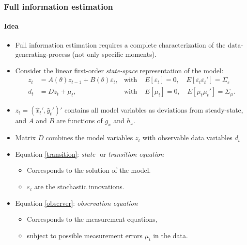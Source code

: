 \documentclass[handout]{beamer}  %
\begin{document}
\begin{frame}\frametitle{Full information estimation}\framesubtitle{Idea}
	\begin{itemize}
		\item Full information estimation requires a complete characterization of the data-generating-process (not only specific moments).
		\item Consider the linear first-order \emph{state-space} representation of the model:
		\begin{align}
			z_t &= A(\theta) {z}_{t-1} + B(\theta) \varepsilon_{t},  &\text{with }& E[\varepsilon_t]= 0,\quad E[\varepsilon_t \varepsilon_t']=\Sigma_\varepsilon \label{transition}\\
			d_t &= D z_t + \mu_t,& \text{with }& E[\mu_t]=0, \quad E[\mu_t \mu_t']= \Sigma_\mu. \label{observer}
		\end{align}
		\item $z_t=(\widehat{x}_t',\widehat{y}_t')'$ contains all model variables as deviations from steady-state, and $A$ and $B$ are functions of $g_x$ and $h_x$.
		\item Matrix $D$ combines the model variables $z_t$ with observable data variables $d_t$
		\item Equation \eqref{transition}: \emph{state-} or \emph{transition-equation}
		\begin{itemize}
			\item Corresponds to the solution of the model.
			\item $\varepsilon_t$ are the stochastic innovations.
		\end{itemize}
		\item Equation \eqref{observer}: \emph{observation-equation}
		\begin{itemize}
			\item Corresponds to the measurement equations,
			\item subject to possible measurement errors $\mu_t$ in the data.
		\end{itemize}
	\end{itemize}
\end{frame}
\end{document}
